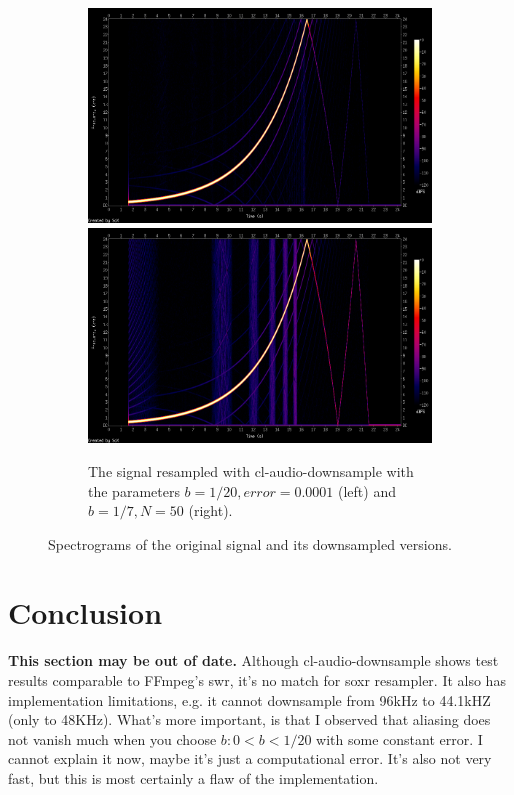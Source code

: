 \documentclass[a4paper,11pt,fleqn]{article}
\begin{document}
\begin{figure}[h!]
  \begin{subfigure}{\linewidth}
  \includegraphics[width=.4\linewidth]{accurate.png}\hfill
  \includegraphics[width=.4\linewidth]{fast.png}\hfill
  \caption{The signal resampled with cl-audio-downsample with the parameters $b=1/20, error=0.0001$ (left) and $b=1/7, N=50$ (right).}
  \end{subfigure}\par\medskip
  \caption{Spectrograms of the original signal and its downsampled versions.}
  \label{spectro}
\end{figure}

\section{Conclusion}
\textbf{This section may be out of date.}
Although cl-audio-downsample shows test results comparable to FFmpeg's swr, it's no match for soxr resampler. It also has implementation limitations, e.g. it cannot downsample from 96kHz to 44.1kHZ (only to 48KHz). What's more
important, is that I observed that aliasing does not vanish much when you choose $b: 0 < b < 1/20$ with some constant error. I cannot explain it now, maybe it's just a computational error. It's also not very fast, but this is
most certainly a flaw of the implementation.
\end{document}
